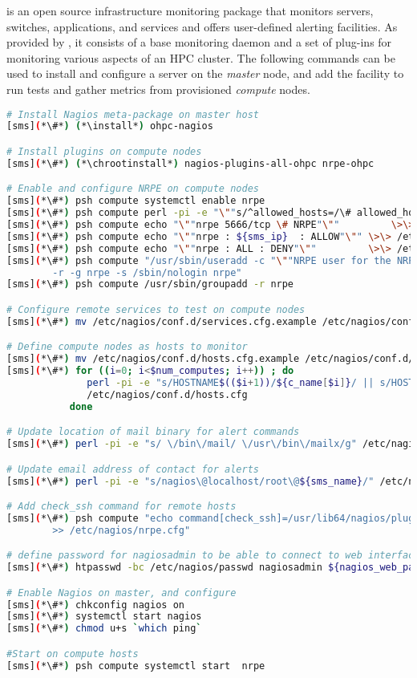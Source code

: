 \Nagios{} is an open source infrastructure monitoring package that monitors
servers, switches, applications, and services and offers user-defined alerting
facilities. As provided by \OHPC{}, it consists of a base monitoring daemon and
a set of plug-ins for monitoring various aspects of an HPC cluster. The
following commands can be used to install and configure a \Nagios{} server on the {\em
master} node, and add the facility to run tests and gather metrics from
provisioned {\em compute} nodes.

\begin{lstlisting}[language=bash,keywords={},upquote=true]
# Install Nagios meta-package on master host
[sms](*\#*) (*\install*) ohpc-nagios

# Install plugins on compute nodes
[sms](*\#*) (*\chrootinstall*) nagios-plugins-all-ohpc nrpe-ohpc

# Enable and configure NRPE on compute nodes
[sms](*\#*) psh compute systemctl enable nrpe
[sms](*\#*) psh compute perl -pi -e "\""s/^allowed_hosts=/\# allowed_hosts=/"\"" /etc/nagios/nrpe.cfg
[sms](*\#*) psh compute echo "\""nrpe 5666/tcp \# NRPE"\""         \>\> /etc/services
[sms](*\#*) psh compute echo "\""nrpe : ${sms_ip}  : ALLOW"\"" \>\> /etc/hosts.allow
[sms](*\#*) psh compute echo "\""nrpe : ALL : DENY"\""         \>\> /etc/hosts.allow
[sms](*\#*) psh compute "/usr/sbin/useradd -c "\""NRPE user for the NRPE service"\"" -d /var/run/nrpe \
        -r -g nrpe -s /sbin/nologin nrpe"
[sms](*\#*) psh compute /usr/sbin/groupadd -r nrpe

# Configure remote services to test on compute nodes
[sms](*\#*) mv /etc/nagios/conf.d/services.cfg.example /etc/nagios/conf.d/services.cfg

# Define compute nodes as hosts to monitor
[sms](*\#*) mv /etc/nagios/conf.d/hosts.cfg.example /etc/nagios/conf.d/hosts.cfg
[sms](*\#*) for ((i=0; i<$num_computes; i++)) ; do
              perl -pi -e "s/HOSTNAME$(($i+1))/${c_name[$i]}/ || s/HOST$(($i+1))_IP/${c_ip[$i]}/" \
              /etc/nagios/conf.d/hosts.cfg
           done

# Update location of mail binary for alert commands
[sms](*\#*) perl -pi -e "s/ \/bin\/mail/ \/usr\/bin\/mailx/g" /etc/nagios/objects/commands.cfg

# Update email address of contact for alerts
[sms](*\#*) perl -pi -e "s/nagios\@localhost/root\@${sms_name}/" /etc/nagios/objects/contacts.cfg

# Add check_ssh command for remote hosts
[sms](*\#*) psh compute "echo command[check_ssh]=/usr/lib64/nagios/plugins/check_ssh localhost \
        >> /etc/nagios/nrpe.cfg"

# define password for nagiosadmin to be able to connect to web interface
[sms](*\#*) htpasswd -bc /etc/nagios/passwd nagiosadmin ${nagios_web_password}

# Enable Nagios on master, and configure
[sms](*\#*) chkconfig nagios on
[sms](*\#*) systemctl start nagios
[sms](*\#*) chmod u+s `which ping`

#Start on compute hosts
[sms](*\#*) psh compute systemctl start  nrpe
\end{lstlisting}

